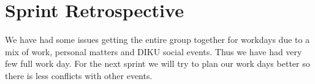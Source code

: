 \section{Sprint Retrospective}

We have had some issues getting the entire group together for workdays due to a mix of work, personal matters and DIKU social events. Thus we have had very few full work day. For the next sprint we will try to plan our work days better so there is less conflicts with other events.